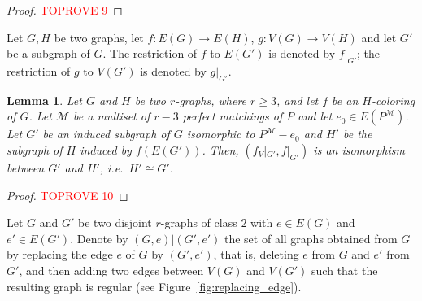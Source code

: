 \documentclass[a4paper,11pt]{article}
\newcommand{\ca}{\mathcal}
\newtheorem{lem}[defi]{Lemma}
\theoremstyle{remark}
\begin{document}
\begin{proof}\textcolor{red}{TOPROVE 9}\end{proof}











Let $G,H$ be two graphs, let $f \colon E(G) \to E(H)$, $g \colon V(G) \to V(H)$ and let $G'$ be a subgraph of $G$. The restriction of $f$ to $E(G')$ is denoted by $f|_{G'}$; the restriction of $g$ to $V(G')$ is denoted by $g|_{G'}$.


\begin{lem}\label{Lemma-PM-e-cong-itselt}
	Let $G$ and $H$ be two $ r $-graphs, where $r \geq 3$, and let $f$ be an $H$-coloring of $G$. 
	Let $\ca M$ be a multiset of $r-3 $ perfect matchings of  $P$ and let $ e_0\in E(P^{\ca M}) $. Let $ G' $ be an induced subgraph of $ G $ isomorphic to $P^{\ca M}-e_0$ and $ H' $ be the subgraph of $ H $ induced by $ f(E(G')) $. 
Then, $ (f_V|_{G'} , f|_{G'} ) $ is an isomorphism between $ G' $ and $ H' $, i.e.\ $ H'\cong G' $.  
\end{lem}

\begin{proof}\textcolor{red}{TOPROVE 10}\end{proof}

Let $ G $ and $ G' $ be two disjoint $ r $-graphs  of class $ 2 $  with $ e\in E(G) $ and $ e'\in E(G') $. Denote by $ (G,e)| (G',e')$  the set of all  graphs obtained from $ G $ by replacing the edge $ e $ of $ G $ by $ (G',e')$, that is,  deleting $ e $ from $ G $ and $ e' $ from $ G' $, and then adding two edges between $ V(G) $ and $ V(G') $ such that the resulting graph is regular (see Figure~\ref{fig:replacing_edge}).
\end{document}
